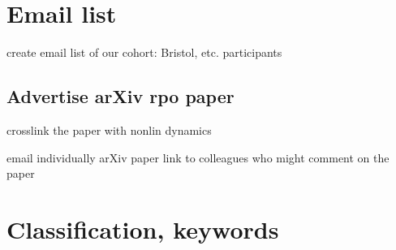 \section{Email list}

create email list of our cohort:  Bristol, etc. participants

\subsection{Advertise arXiv rpo paper}

crosslink the paper with nonlin dynamics

email individually arXiv paper link to colleagues who might comment
    on the paper

\section{Classification, keywords}

